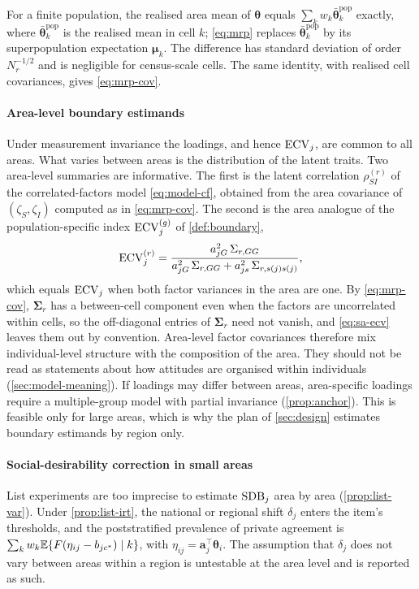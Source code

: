 \begin{remark}\label{rem:sa-finite}
For a finite population, the realised area mean of $\bm\theta$ equals $\sum_kw_k\bar{\bm\theta}_k^{\mathrm{pop}}$ exactly, where $\bar{\bm\theta}_k^{\mathrm{pop}}$ is the realised mean in cell $k$; \eqref{eq:mrp} replaces $\bar{\bm\theta}_k^{\mathrm{pop}}$ by its superpopulation expectation $\bm\mu_k$. The difference has standard deviation of order $N_r^{-1/2}$ and is negligible for census-scale cells. The same identity, with realised cell covariances, gives \eqref{eq:mrp-cov}.
\end{remark}

\paragraph{Area-level boundary estimands}
Under measurement invariance the loadings, and hence $\mathrm{ECV}_j$, are common to all areas. What varies between areas is the distribution of the latent traits. Two area-level summaries are informative. The first is the latent correlation $\rho_{SI}^{(r)}$ of the correlated-factors model \eqref{eq:model-cf}, obtained from the area covariance of $(\zeta_S,\zeta_I)$ computed as in \eqref{eq:mrp-cov}. The second is the area analogue of the population-specific index $\mathrm{ECV}^{(g)}_j$ of \cref{def:boundary},
\begin{equation}\label{eq:sa-ecv}
  \mathrm{ECV}_j^{(r)}=\frac{a_{jG}^2\,\Sigma_{r,GG}}{a_{jG}^2\,\Sigma_{r,GG}+a_{js}^2\,\Sigma_{r,s(j)s(j)}},
\end{equation}
which equals $\mathrm{ECV}_j$ when both factor variances in the area are one. By \eqref{eq:mrp-cov}, $\bm\Sigma_r$ has a between-cell component even when the factors are uncorrelated within cells, so the off-diagonal entries of $\bm\Sigma_r$ need not vanish, and \eqref{eq:sa-ecv} leaves them out by convention. Area-level factor covariances therefore mix individual-level structure with the composition of the area. They should not be read as statements about how attitudes are organised within individuals (\cref{sec:model-meaning}). If loadings may differ between areas, area-specific loadings require a multiple-group model with partial invariance (\cref{prop:anchor}). This is feasible only for large areas, which is why the plan of \cref{sec:design} estimates boundary estimands by region only.

\paragraph{Social-desirability correction in small areas}
List experiments are too imprecise to estimate $\mathrm{SDB}_j$ area by area (\cref{prop:list-var}). Under \cref{prop:list-irt}, the national or regional shift $\delta_j$ enters the item's thresholds, and the poststratified prevalence of private agreement is $\sum_kw_k\mathbb{E}\{F(\eta_{ij}-b_{jc^*})\mid k\}$, with $\eta_{ij}=\bm a_j^\top\bm\theta_i$. The assumption that $\delta_j$ does not vary between areas within a region is untestable at the area level and is reported as such.

